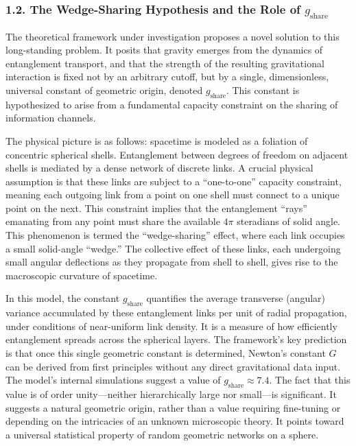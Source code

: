 \documentclass[11pt]{article}
\begin{document}
\subsubsection*{1.2. The Wedge-Sharing Hypothesis and the Role of $g_{\mathrm{share}}$}
The theoretical framework under investigation proposes a novel solution to this long-standing problem. It posits that gravity emerges from the dynamics of entanglement transport, and that the strength of the resulting gravitational interaction is fixed not by an arbitrary cutoff, but by a single, dimensionless, universal constant of geometric origin, denoted $g_{\mathrm{share}}$. This constant is hypothesized to arise from a fundamental capacity constraint on the sharing of information channels.

The physical picture is as follows: spacetime is modeled as a foliation of concentric spherical shells. Entanglement between degrees of freedom on adjacent shells is mediated by a dense network of discrete links. A crucial physical assumption is that these links are subject to a “one-to-one” capacity constraint, meaning each outgoing link from a point on one shell must connect to a unique point on the next. This constraint implies that the entanglement “rays” emanating from any point must share the available $4\pi$ steradians of solid angle. This phenomenon is termed the “wedge-sharing” effect, where each link occupies a small solid-angle “wedge.” The collective effect of these links, each undergoing small angular deflections as they propagate from shell to shell, gives rise to the macroscopic curvature of spacetime.

In this model, the constant $g_{\mathrm{share}}$ quantifies the average transverse (angular) variance accumulated by these entanglement links per unit of radial propagation, under conditions of near-uniform link density. It is a measure of how efficiently entanglement spreads across the spherical layers. The framework’s key prediction is that once this single geometric constant is determined, Newton’s constant $G$ can be derived from first principles without any direct gravitational data input. The model’s internal simulations suggest a value of $g_{\mathrm{share}} \approx 7.4$. The fact that this value is of order unity—neither hierarchically large nor small—is significant. It suggests a natural geometric origin, rather than a value requiring fine-tuning or depending on the intricacies of an unknown microscopic theory. It points toward a universal statistical property of random geometric networks on a sphere.
\end{document}
